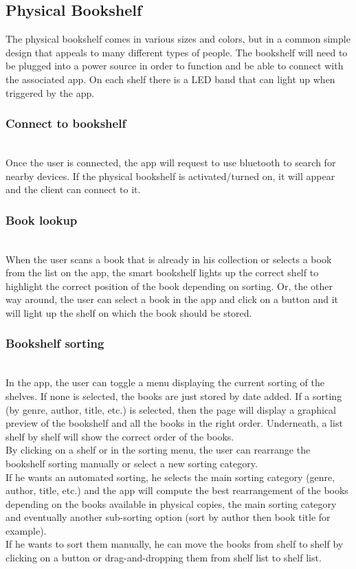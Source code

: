 \documentclass[conference]{IEEEtran}
\begin{document}
\subsection{Physical Bookshelf}

The physical bookshelf comes in various sizes and colors, but in a common simple design that appeals to many different types of people. The bookshelf will need to be plugged into a power source in order to function and be able to connect with the associated app. On each shelf there is a LED band that can light up when triggered by the app. \\

\subsubsection{Connect to bookshelf}\hfill\\
Once the user is connected, the app will request to use bluetooth to search for nearby devices. If the physical bookshelf is activated/turned on, it will appear and the client can connect to it.\\

\subsubsection{Book lookup}\hfill\\
When the user scans a book that is already in his collection or selects a book from the list on the app, the smart bookshelf lights up the correct shelf to highlight the correct position of the book depending on sorting. Or, the other way around, the user can select a book in the app and click on a button and it will light up the shelf on which the book should be stored.\\

\subsubsection{Bookshelf sorting}\hfill\\
In the app, the user can toggle a menu displaying the current sorting of the shelves. If none is selected, the books are just stored by date added. If a sorting (by genre, author, title, etc.) is selected, then the page will display a graphical preview of the bookshelf and all the books in the right order. Underneath, a list shelf by shelf will show the correct order of the books.\\
By clicking on a shelf or in the sorting menu, the user can rearrange the bookshelf sorting manually or select a new sorting category.\\
If he wants an automated sorting, he selects the main sorting category (genre, author, title, etc.) and the app will compute the best rearrangement of the books depending on the books available in physical copies, the main sorting category and eventually another sub-sorting option (sort by author then book title for example).\\
If he wants to sort them manually, he can move the books from shelf to shelf by clicking on a button or drag-and-dropping them from shelf list to shelf list.\\
\end{document}
